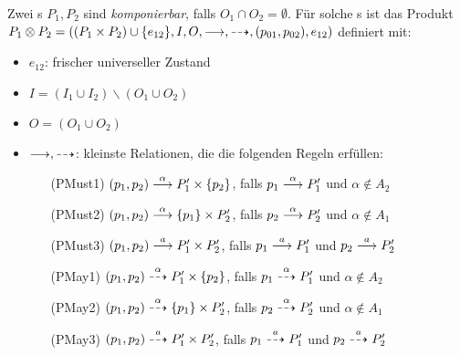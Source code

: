 \begin{Def}[Parallelprodukt]
  Zwei \MIA{}s $P_1,P_2$ sind \emph{komponierbar}, falls $O_1\cap
  O_2=\emptyset$. Für solche \MIA{}s ist das Produkt $P_1\otimes
  P_2=((P_1\times P_2)\cup \{e_{12}\}, I, O, \must, \may, (p_{01}, p_{02}),
  e_{12})$ definiert mit:
  \begin{itemize}
    \item $e_{12}$: frischer universeller Zustand
    \item $I=(I_1\cup I_2)\backslash (O_1\cup O_2)$
    \item $O=(O_1\cup O_2)$
    \item $\must, \may$: kleinste Relationen, die die
      folgenden Regeln erfüllen:
    \begin{itemize}
      \item[(PMust1)] $(p_1,p_2)\must[\alpha] P_1'\times \{p_2\}$, falls
        $p_1\must[\alpha] P_1'$ und $\alpha\notin A_2$
      \item[(PMust2)] $(p_1,p_2)\must[\alpha] \{p_1\}\times P_2'$, falls
        $p_2\must[\alpha] P_2'$ und $\alpha\notin A_1$
      \item[(PMust3)] $(p_1,p_2)\must[a] P_1'\times P_2'$, falls
        $p_1\must[a] P_1'$ und $p_2\must[a] P_2'$
      \item[(PMay1)] $(p_1,p_2)\may[\alpha] P_1'\times \{p_2\}$, falls
        $p_1\may[\alpha] P_1'$ und $\alpha\notin A_2$
      \item[(PMay2)] $(p_1,p_2)\may[\alpha] \{p_1\}\times P_2'$, falls
        $p_2\may[\alpha] P_2'$ und $\alpha\notin A_1$
      \item[(PMay3)] $(p_1,p_2)\may[a] P_1'\times P_2'$, falls
        $p_1\may[a] P_1'$ und $p_2\may[a] P_2'$
    \end{itemize}
  \end{itemize}
\end{Def}

